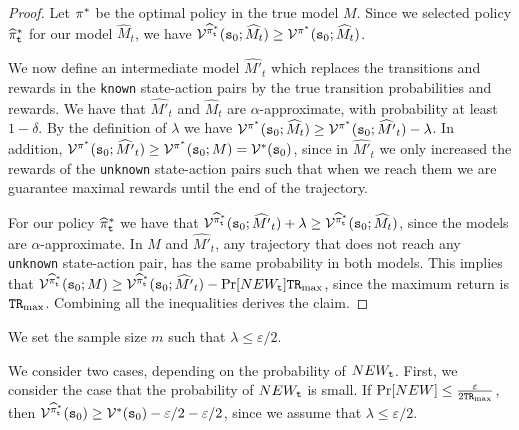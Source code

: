 \begin{proof}
Let $\pi^*$ be the optimal policy in the true model $M$. Since we selected policy $\widehat{\pi}^*_{\tt t}$ for our model $\widehat{M}_t$, we have $\mathcal{V}^{\widehat{\pi}^*_{\tt t}}({\tt s}_0;\widehat{M}_t)\geq \mathcal{V}^{\pi^*}({\tt s}_0;\widehat{M}_t)$. 

We now define an intermediate model $\widehat{M'}_t$ which replaces the transitions and rewards in the \texttt{known} state-action pairs by the true transition probabilities and rewards. We have that $\widehat{M'}_t$ and $\widehat{M}_t$ are $\alpha$-approximate, with probability at least $1-\delta$.
By the definition of $\lambda$ we have $\mathcal{V}^{\pi^*}({\tt s}_0;\widehat{M}_t)\geq \mathcal{V}^{\pi^*}({\tt s}_0;\widehat{M'}_t)-\lambda$. In addition, $\mathcal{V}^{\pi^*}({\tt s}_0;\widehat{M'}_t)\geq \mathcal{V}^{\pi^*}({\tt s}_0;M)=\mathcal{V}^*({\tt s}_0)$, since in $\widehat{M'}_t$ we only increased the rewards of the \texttt{unknown} state-action pairs such that when we reach them we are guarantee maximal rewards until the end of the trajectory.

For our policy $\widehat{\pi}^*_{\tt t}$ we have that 
 $\mathcal{V}^{\widehat{\pi}^*_{\tt t}}({\tt s}_0;\widehat{M'}_t)+\lambda\geq \mathcal{V}^{\widehat{\pi}^*_{\tt t}}({\tt s}_0;\widehat{M}_t)$, since the models are $\alpha$-approximate.
%
In $M$ and $\widehat{M'}_t$, any trajectory that does not reach any \texttt{unknown} state-action pair, has the same probability in both models. This implies that 
  $\mathcal{V}^{\widehat{\pi}^*_{\tt t}}({\tt s}_0;M)\geq \mathcal{V}^{\widehat{\pi}^*_{\tt t}}({\tt s}_0;\widehat{M'}_t)-\Pr[NEW_{\tt t}]{\tt T}{\tt R}_{\max }$, since the maximum return is ${\tt T}{\tt R}_{\max }$. Combining all the inequalities derives the claim.
\end{proof}



We set the sample size $m$ such that $\lambda \leq\varepsilon/2$.

We consider two cases, depending on the probability of $NEW_{\tt t}$. First,
we consider the case that the probability of $NEW_{\tt t}$ is small. If
$\Pr[NEW]\leq \frac{\varepsilon}{2{\tt T}{\tt R}_{\max }}$, then
$\mathcal{V}^{\widehat{\pi}^*_{\tt t}}({\tt s}_0)\geq \mathcal{V}^*({\tt s}_0)
-\varepsilon/2 -\varepsilon/2$, since we assume that $\lambda\leq
\varepsilon/2$.

